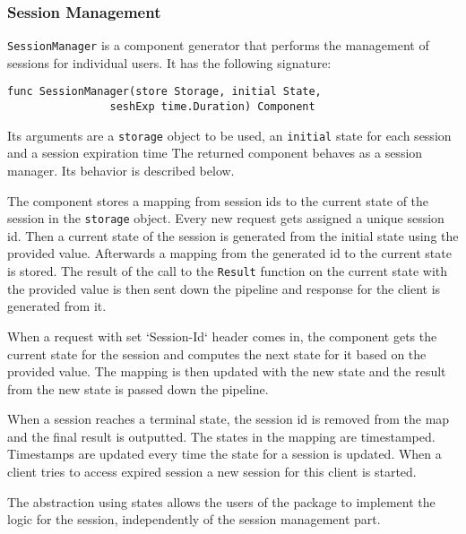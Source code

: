 \subsubsection{Session Management}
\texttt{SessionManager} is a component generator that performs the 
management of sessions for individual users. It has the following signature:
\begin{lstlisting}
func SessionManager(store Storage, initial State, 
                seshExp time.Duration) Component
\end{lstlisting}
Its arguments are a \texttt{storage} object to be used, an \texttt{initial} 
state for each session and
a session expiration time
The returned component behaves as a session manager. 
Its behavior is described below.

The component stores a mapping from session ids to the current state of the session
in the \texttt{storage} object.
Every new request gets assigned a unique session id. Then a current state
of the session is generated from the initial state using the provided
value. Afterwards a mapping from the generated id to the current state
is stored. The result of the call to the \texttt{Result} function on the
current state with the provided value is then sent down the pipeline and
response for the client is generated from it.

When a request with set `Session-Id` header comes in, the component gets the current 
state for the session and computes the next state for it based on the provided value.
The mapping is then updated with the new state and the result from the new state
is passed down the pipeline.

When a session reaches a terminal state, the session id is removed from the map
and the final result is outputted.
The states in the mapping are timestamped. Timestamps are updated every time
the state for a session is updated. When a client tries to access expired
session a new session for this client is started.

The abstraction using states allows the users of the package to implement the
logic for the session, independently of the session management part.

